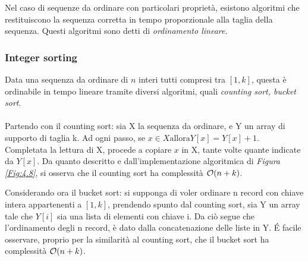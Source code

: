\documentclass{subfiles}
\begin{document}
Nel caso di sequenze da ordinare con particolari proprietà, esistono algoritmi che restituiscono la sequenza corretta in tempo proporzionale alla taglia della sequenza.
Questi algoritmi sono detti di \emph{ordinamento lineare}.

\subsubsection{Integer sorting}
Data una sequenza da ordinare di \(n\) interi tutti compresi tra \([1, k]\), questa è ordinabile in tempo lineare tramite diversi algoritmi,
quali \emph{counting sort, bucket sort}.
\\ \\
Partendo con il counting sort: sia X la sequenza da ordinare, e Y un array di supporto di taglia k.
Ad ogni passo, se \(x \in X \text{allora} Y[x] = Y[x] + 1\). Completata la lettura di X, procede a copiare \(x\) in X, tante volte quante indicate da \(Y[x]\).
Da quanto descritto e dall'implementazione algoritmica di \emph{Figura \ref{Fig:4.8}}, si osserva che il counting sort ha complessità \(\order{n + k}\).


\noindent Considerando ora il bucket sort: si supponga di voler ordinare n record con chiave intera appartenenti a \([1, k]\), prendendo spunto dal counting sort,
sia Y un array tale che \(Y[i]\) sia una lista di elementi con chiave i. Da ciò segue che l'ordinamento degli n record, è dato dalla concatenazione delle liste in Y.
\'E facile osservare, proprio per la similarità al counting sort, che il bucket sort ha complessità \(\order{n + k}\).
\end{document}

